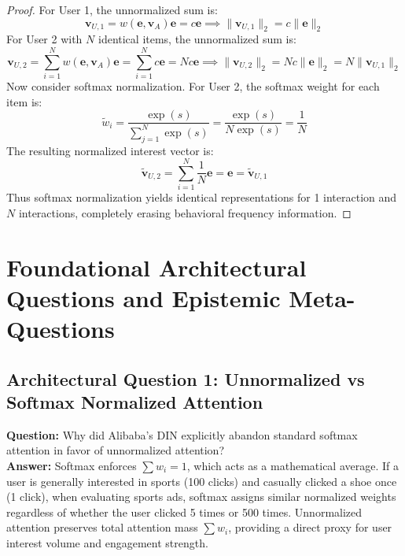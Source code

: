 \documentclass[11pt,a4paper]{article}
\theoremstyle{definition}
\begin{document}
\begin{proof}
For User 1, the unnormalized sum is:
{\boldmath
\begin{equation}
\mathbf{v}_{U, 1} = w(\mathbf{e}, \mathbf{v}_A) \mathbf{e} = c \mathbf{e} \implies \|\mathbf{v}_{U, 1}\|_2 = c \|\mathbf{e}\|_2
\end{equation}
}
For User 2 with $N$ identical items, the unnormalized sum is:
{\boldmath
\begin{equation}
\mathbf{v}_{U, 2} = \sum_{i=1}^N w(\mathbf{e}, \mathbf{v}_A) \mathbf{e} = \sum_{i=1}^N c \mathbf{e} = N c \mathbf{e} \implies \|\mathbf{v}_{U, 2}\|_2 = N c \|\mathbf{e}\|_2 = N \|\mathbf{v}_{U, 1}\|_2
\end{equation}
}
Now consider softmax normalization.
For User 2, the softmax weight for each item is:
{\boldmath
\begin{equation}
\widetilde{w}_i = \frac{\exp(s)}{\sum_{j=1}^N \exp(s)} = \frac{\exp(s)}{N \exp(s)} = \frac{1}{N}
\end{equation}
}
The resulting normalized interest vector is:
{\boldmath
\begin{equation}
\widetilde{\mathbf{v}}_{U, 2} = \sum_{i=1}^N \frac{1}{N} \mathbf{e} = \mathbf{e} = \widetilde{\mathbf{v}}_{U, 1}
\end{equation}
}
Thus softmax normalization yields identical representations for 1 interaction and $N$ interactions, completely erasing behavioral frequency information.
\end{proof}

\section{Foundational Architectural Questions and Epistemic Meta-Questions}

\subsection{Architectural Question 1: Unnormalized vs Softmax Normalized Attention}
\textbf{Question:} Why did Alibaba's DIN explicitly abandon standard softmax attention in favor of unnormalized attention?\\
\textbf{Answer:} Softmax enforces $\sum w_i = 1$, which acts as a mathematical average. If a user is generally interested in sports (100 clicks) and casually clicked a shoe once (1 click), when evaluating sports ads, softmax assigns similar normalized weights regardless of whether the user clicked 5 times or 500 times. Unnormalized attention preserves total attention mass $\sum w_i$, providing a direct proxy for user interest volume and engagement strength.
\end{document}
